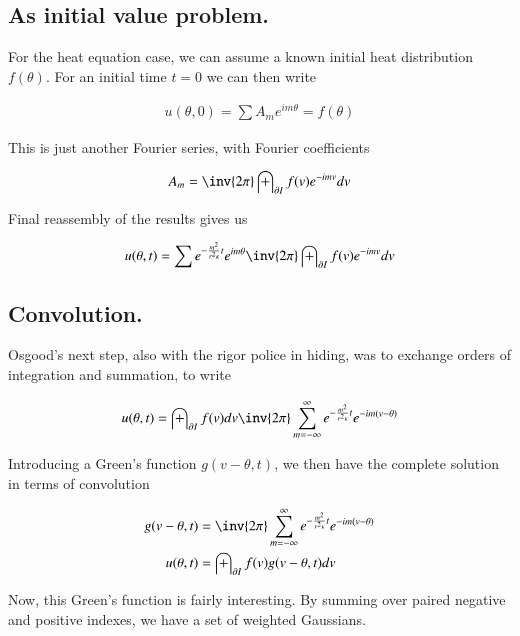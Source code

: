 \documentclass{article}
\begin{document}
\subsection{ As initial value problem. }

For the heat equation case, we can assume a known initial heat distribution 
$f(\theta)$.
For an initial time $t=0$ we can then write

\begin{align*}
u(\theta, 0) = \sum A_m e^{i m \theta} = f(\theta)
\end{align*}

This is just another Fourier series, with Fourier coefficients

\begin{align*}
A_m = \inv{2\pi} \int_{\partial I} f(v) e^{-i m v} dv
\end{align*}

Final reassembly of the results gives us

\begin{align}
u(\theta, t) = \sum e^{- \frac{m^2}{ r^2 \kappa } t } e^{i m \theta} \inv{2\pi} \int_{\partial I} f(v) e^{-i m v} dv
\end{align}

\subsection{ Convolution. }

Osgood's next step, also with the rigor police in hiding, was to exchange orders of integration and summation, to write

\begin{align*}
u(\theta, t) 
&= 
\int_{\partial I} f(v) dv \inv{2 \pi} \sum_{m=-\infty}^{\infty} e^{- \frac{m^2}{ r^2 \kappa } t } e^{-i m (v -\theta)} \\
\end{align*}

Introducing a Green's function $g(v - \theta, t)$, we then have the complete solution in terms of convolution

\begin{align}
g( v - \theta, t ) &= \inv{2 \pi} \sum_{m=-\infty}^\infty e^{- \frac{m^2}{ r^2 \kappa } t } e^{-i m (v -\theta)} \\
u(\theta, t) &= \int_{\partial I} f(v) g(v - \theta, t) dv 
\end{align}

Now, this Green's function is fairly interesting.  By summing over paired negative and positive indexes, we have a set of
weighted Gaussians.
\end{document}
